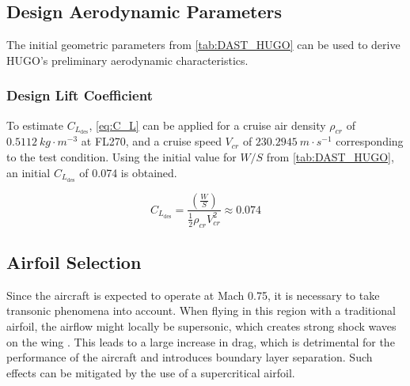 


\subsection{Design Aerodynamic Parameters}
\label{subsec:cl_des}
The initial geometric parameters from \autoref{tab:DAST_HUGO} can be used to derive HUGO's preliminary aerodynamic characteristics.

\subsubsection*{Design Lift Coefficient}
To estimate $C_{L_\text{des}}$, \autoref{eq:C_L} \cite{Torenbeek1982} can be applied for a cruise air density $\rho_{cr}$ of $0.5112 \ kg \cdot m^{-3}$ at FL270, and a cruise speed $V_{cr}$ of $230.2945 \ m \cdot s^{-1}$ corresponding to the test condition. Using the initial value for $W/S$ from \autoref{tab:DAST_HUGO}, an initial $C_{L_\text{des}}$ of 0.074 is obtained.

\begin{equation}
    C_{L_\text{des}} = \frac{\left(\frac{W}{S}\right)}{\frac{1}{2} \rho_{cr} V_{cr}^2} \approx 0.074
    \label{eq:C_L}
\end{equation}

\subsection{Airfoil Selection}
\label{subsec:airfoil_selection}
Since the aircraft is expected to operate at Mach 0.75, it is necessary to take transonic phenomena into account. When flying in this region with a traditional airfoil, the airflow might locally be supersonic, which creates strong shock waves on the wing \cite{Whitcomb1974}. This leads to a large increase in drag, which is detrimental for the performance of the aircraft and introduces boundary layer separation. Such effects can be mitigated by the use of a supercritical airfoil. 

